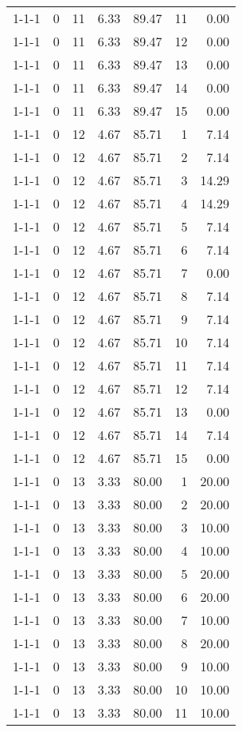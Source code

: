 \begin{tabular}{lrrrrrr}
1-1-1 & 0 & 11 & 6.33 & 89.47 & 11 & 0.00 \\
1-1-1 & 0 & 11 & 6.33 & 89.47 & 12 & 0.00 \\
1-1-1 & 0 & 11 & 6.33 & 89.47 & 13 & 0.00 \\
1-1-1 & 0 & 11 & 6.33 & 89.47 & 14 & 0.00 \\
1-1-1 & 0 & 11 & 6.33 & 89.47 & 15 & 0.00 \\
1-1-1 & 0 & 12 & 4.67 & 85.71 & 1 & 7.14 \\
1-1-1 & 0 & 12 & 4.67 & 85.71 & 2 & 7.14 \\
1-1-1 & 0 & 12 & 4.67 & 85.71 & 3 & 14.29 \\
1-1-1 & 0 & 12 & 4.67 & 85.71 & 4 & 14.29 \\
1-1-1 & 0 & 12 & 4.67 & 85.71 & 5 & 7.14 \\
1-1-1 & 0 & 12 & 4.67 & 85.71 & 6 & 7.14 \\
1-1-1 & 0 & 12 & 4.67 & 85.71 & 7 & 0.00 \\
1-1-1 & 0 & 12 & 4.67 & 85.71 & 8 & 7.14 \\
1-1-1 & 0 & 12 & 4.67 & 85.71 & 9 & 7.14 \\
1-1-1 & 0 & 12 & 4.67 & 85.71 & 10 & 7.14 \\
1-1-1 & 0 & 12 & 4.67 & 85.71 & 11 & 7.14 \\
1-1-1 & 0 & 12 & 4.67 & 85.71 & 12 & 7.14 \\
1-1-1 & 0 & 12 & 4.67 & 85.71 & 13 & 0.00 \\
1-1-1 & 0 & 12 & 4.67 & 85.71 & 14 & 7.14 \\
1-1-1 & 0 & 12 & 4.67 & 85.71 & 15 & 0.00 \\
1-1-1 & 0 & 13 & 3.33 & 80.00 & 1 & 20.00 \\
1-1-1 & 0 & 13 & 3.33 & 80.00 & 2 & 20.00 \\
1-1-1 & 0 & 13 & 3.33 & 80.00 & 3 & 10.00 \\
1-1-1 & 0 & 13 & 3.33 & 80.00 & 4 & 10.00 \\
1-1-1 & 0 & 13 & 3.33 & 80.00 & 5 & 20.00 \\
1-1-1 & 0 & 13 & 3.33 & 80.00 & 6 & 20.00 \\
1-1-1 & 0 & 13 & 3.33 & 80.00 & 7 & 10.00 \\
1-1-1 & 0 & 13 & 3.33 & 80.00 & 8 & 20.00 \\
1-1-1 & 0 & 13 & 3.33 & 80.00 & 9 & 10.00 \\
1-1-1 & 0 & 13 & 3.33 & 80.00 & 10 & 10.00 \\
1-1-1 & 0 & 13 & 3.33 & 80.00 & 11 & 10.00 \\

\end{tabular}
